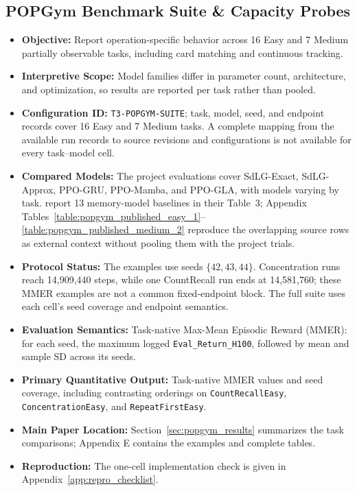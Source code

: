 \subsection{POPGym Benchmark Suite \& Capacity Probes}
\begin{itemize}
    \item \textbf{Objective:} Report operation-specific behavior across 16 Easy and 7 Medium partially observable tasks, including card matching and continuous tracking.
    \item \textbf{Interpretive Scope:} Model families differ in parameter count, architecture, and optimization, so results are reported per task rather than pooled.
    \item \textbf{Configuration ID:} \texttt{T3-POPGYM-SUITE}; task, model, seed, and endpoint records cover 16 Easy and 7 Medium tasks. A complete mapping from the available run records to source revisions and configurations is not available for every task--model cell.
    \item \textbf{Compared Models:} The project evaluations cover SdLG-Exact, SdLG-Approx, PPO-GRU, PPO-Mamba, and PPO-GLA, with models varying by task. \citet{morad2023popgym} report 13 memory-model baselines in their Table~3; Appendix Tables~\ref{table:popgym_published_easy_1}--\ref{table:popgym_published_medium_2} reproduce the overlapping source rows as external context without pooling them with the project trials.
    \item \textbf{Protocol Status:} The examples use seeds $\{42,43,44\}$. Concentration runs reach 14,909,440 steps, while one CountRecall run ends at 14,581,760; these MMER examples are not a common fixed-endpoint block. The full suite uses each cell's seed coverage and endpoint semantics.
    \item \textbf{Evaluation Semantics:} Task-native Max-Mean Episodic Reward (MMER): for each seed, the maximum logged \texttt{Eval\_Return\_H100}, followed by mean and sample SD across its seeds.
    \item \textbf{Primary Quantitative Output:} Task-native MMER values and seed coverage, including contrasting orderings on \texttt{CountRecallEasy}, \texttt{ConcentrationEasy}, and \texttt{RepeatFirstEasy}.
    \item \textbf{Main Paper Location:} Section~\ref{sec:popgym_results} summarizes the task comparisons; Appendix E contains the examples and complete tables.
    \item \textbf{Reproduction:} The one-cell implementation check is given in Appendix~\ref{app:repro_checklist}.
\end{itemize}

